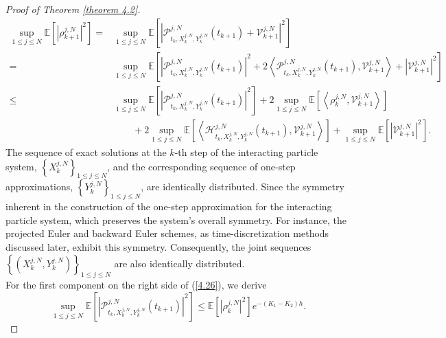 \documentclass[12pt]{article}
\numberwithin{equation}{section}
\begin{document}
\begin{proof}[ Proof of Theorem \ref{theorem 4.2}]
\begin{equation}\tag{5.39}\label{4.26}
\begin{aligned}
 \underset{1\leqslant j\leqslant N}{\sup}\mathbb{E}\left[\left|\rho^{j,N}_{k+1}\right|^{2}\right] 
= & \underset{1\leqslant j\leqslant N}{\sup}\mathbb{E}\left[\left|\mathcal{P}^{j,N}_{t_k, X^{j,N}_k, Y^{j,N}_k}\left(t_{k+1}\right)+\mathcal{V}^{j,N}_{k+1}\right|^{2}\right] \\
= &\underset{1\leqslant j\leqslant N}{\sup} \mathbb{E}\left[\left|\mathcal{P}^{j,N}_{t_k, X^{j,N}_k, Y^{j,N}_k}\left(t_{k+1}\right)\right|^2+2\left\langle\mathcal{P}^{j,N}_{t_k, X^{j,N}_k, Y^{j,N}_k}\left(t_{k+1}\right), \mathcal{V}^{j,N}_{k+1}\right\rangle+\left|\mathcal{V}^{j,N}_{k+1}\right|^2\right] \\
\leq & \underset{1\leqslant j\leqslant N}{\sup}\mathbb{E}\left[\left|\mathcal{P}^{j,N}_{t_k, X^{j,N}_k, Y^{j,N}_k}\left(t_{k+1}\right)\right|^{2}\right]+2\underset{1\leqslant j\leqslant N}{\sup}\mathbb{E}\left[\left\langle\rho^{j,N}_k, \mathcal{V}^{j,N}_{k+1}\right\rangle\right]\\
&\qquad  +2\underset{1\leqslant j\leqslant N}{\sup}\mathbb{E}\left[\left\langle\mathcal{H}^{j,N}_{t_k, X^{j,N}_k, Y^{j,N}_k}\left(t_{k+1}\right), \mathcal{V}^{j,N}_{k+1}\right\rangle\right]+\underset{1\leqslant j\leqslant N}{\sup}\mathbb{E}\left[\left|\mathcal{V}^{j,N}_{k+1}\right|^2\right].
\end{aligned}
\end{equation}
The sequence of exact solutions at the $k$-th step of the interacting particle system, $\left\{ X_{k}^{j,N} \right\} _{1\leq j\leq N}$,
and the corresponding sequence of one-step approximations, $\left\{ Y_{k}^{j,N} \right\} _{1\leq j\leq N}$, are identically distributed. Since the symmetry inherent in the construction of the one-step approximation for the interacting particle system, which preserves the system's overall symmetry. For instance, the projected Euler and backward Euler schemes, as time-discretization methods discussed later, exhibit this symmetry. Consequently, the joint sequences $\left\{ \left( X_{k}^{j,N},Y_{k}^{j,N} \right) \right\} _{1\leq j\leq N}$ are also identically distributed.\\
For the first component on the right side of (\ref{4.26}),  
we derive 
\begin{equation}\tag{5.40}\label{4.27}
\underset{1\leqslant j\leqslant N}{\sup}\mathbb{E}\left[\left|\mathcal{P}^{j,N}_{t_k, X^{j,N}_k, Y^{j,N}_k}\left(t_{k+1}\right)\right|^{2}\right] \leq \mathbb{E}\left[\left|\rho^{j,N}_k\right|^{2}\right] e^{-\left(K_1-K_2\right)h}.

\end{equation}
\end{proof}
\end{document}
